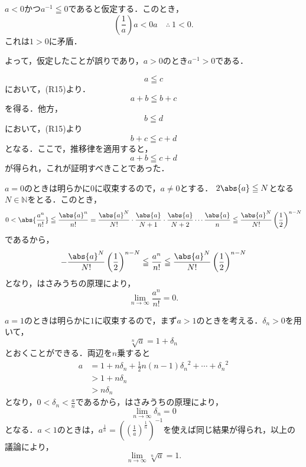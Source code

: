 \begin{tproof}
    $a<0$かつ$a^{-1} \leqq 0$であると仮定する．このとき，
    \[
        \left( \frac{1}{a} \right) a < 0a \quad \therefore ~ 1 < 0.
    \]
    これは$1>0$に矛盾．

    よって，仮定したことが誤りであり，$a>0$のとき$a^{-1} >0$である．
\end{tproof}

\begin{tproof}
    \[
        a \leqq c
    \]
    において，(R15)より．
    \[
        a+b \leqq b+c
    \]
    を得る．他方，
    \[
        b \leqq d
    \]
    において，(R15)より
    \[
        b + c \leqq c+d
    \]
    となる．ここで，推移律を適用すると，
    \[
        a+b \leqq c+d
    \]
    が得られ，これが証明すべきことであった．
\end{tproof}



\begin{tanswer}
    $a=0$のときは明らかに$0$に収束するので，$a \ne 0$とする．
    $2\abs{a} \le N$となる$N \in \mathbb{N}$をとる．このとき，
    \[
        0  < \abs{ \frac{a^n}{n!} } \le \frac{\abs{a}^n}{n!}= \frac{\abs{a}^{N}}{N!} \cdot \frac{\abs{a}}{N+1} \cdot \frac{\abs{a}}{N+2} \dotsm \frac{\abs{a}}{n} \le  \frac{\abs{a}^{N}}{N!} \left(\frac{1}{2} \right)^{n-N}
    \]
    であるから，
    \[
        - \frac{\abs{a}^{N}}{N!} \left(\frac{1}{2} \right)^{n-N} \le  \frac{a^n}{n!} \le \frac{\abs{a}^{N}}{N!} \left(\frac{1}{2} \right)^{n-N}
    \]
    となり，はさみうちの原理により，
    \[
        \lim_{n \to \infty} \frac{a^n}{n!} =0.
    \]
\end{tanswer}


\begin{tanswer}
    $a=1$のときは明らかに$1$に収束するので，まず$a>1$のときを考える．$\delta_n >0$を用いて，
    \[
        \sqrt[n]{a} =1+\delta_n
    \]
    とおくことができる．両辺を$n$乗すると
    \begin{align*}
        a & = 1+ n \delta_n + \frac{1}{2}n(n-1) {\delta_n}^2 + \cdots + {\delta_n}^2 \\
          & >1+n \delta_n                                                            \\
          & >n \delta_n
    \end{align*}
    となり，$0<\delta_n <\frac{a}{n}$であるから，はさみうちの原理により，
    \[
        \lim_{n \to \infty} \delta_n =0
    \]
    となる．$a<1$のときは，$a^{\frac{1}{n}}=\left(\left(\frac{1}{a}\right)^{\frac{1}{n}}\right)^{-1}$を使えば同じ結果が得られ，以上の議論により，
    \[
        \lim_{n \to \infty} \sqrt[n]{a} =1.
    \]
\end{tanswer}

